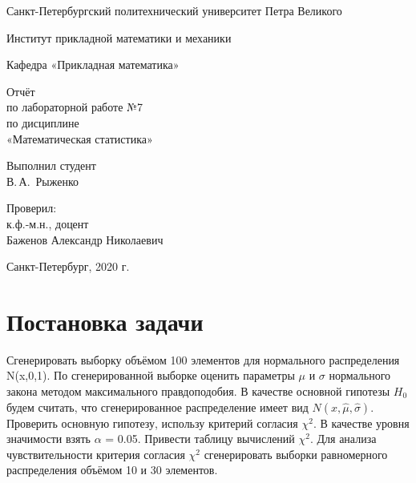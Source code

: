 \documentclass[12pt,a4paper]{scrartcl}
\begin{document}
\begin{titlepage}
  \begin{center}

    Санкт-Петербургский политехнический университет Петра Великого

    \vspace{0.25cm}
    
    Институт прикладной математики и механики
    
    Кафедра «Прикладная математика»
    \vfill

	\vspace{0.25cm}
	    Отчёт\\
	по лабораторной работе №7\\
	по дисциплине\\
	«Математическая статистика»

  \bigskip

\end{center}
\vfill

\newlength{\ML}
\hfill\begin{minipage}{0.4\textwidth}
  Выполнил студент\\ В.\,А.~Рыженко\\
\end{minipage}%
\bigskip

\hfill\begin{minipage}{0.4\textwidth}
  Проверил:\\
к.ф.-м.н., доцент\\
Баженов Александр Николаевич\\
\end{minipage}%
\vfill

\begin{center}
  Санкт-Петербург, 2020 г.
\end{center}
\end{titlepage}

\tableofcontents
\listoftables
\newpage

\section{Постановка задачи}
 
 Сгенерировать выборку объёмом 100 элементов для нормального распределения N(x,0,1). По сгенерированной выборке оценить параметры $\mu$ и $\sigma$ нормального закона методом максимального правдоподобия. В качестве основной гипотезы $H_{0}$ будем считать, что сгенерированное распределение имеет вид $N(x,\hat{\mu}, \hat{\sigma})$. Проверить основную гипотезу, использу критерий согласия $\chi^{2}$. В качестве уровня значимости взять $\alpha$ = 0.05. Привести таблицу вычислений $\chi^{2}$. 
 \newline
Для анализа чувствительности критерия согласия $\chi^{2}$ сгенерировать выборки равномерного распределения объёмом 10 и 30 элементов.
\end{document}
